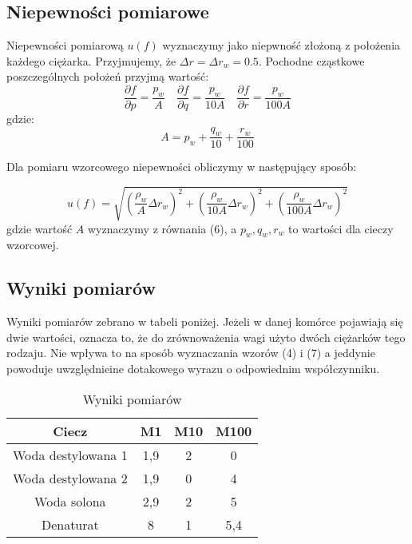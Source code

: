 \documentclass{article} %
\begin{document}
\subsection{Niepewności pomiarowe}

Niepewności pomiarową $u(f)$ wyznaczymy jako niepwność złożoną z położenia każdego ciężarka. Przyjmujemy, że $\Delta r = \Delta r_w = 0.5$. Pochodne cząstkowe poszczególnych położeń przyjmą wartość:
{\
    \begin{equation}
        \frac{\partial f}{\partial p} = \frac{p_w}{A}
        \quad\frac{\partial f}{\partial q} = \frac{p_w}{10A}
        \quad\frac{\partial f}{\partial r} = \frac{p_w}{100A}
    \end{equation}
}
gdzie:
{\
    \begin{equation}
        A = p_w + \frac{q_w}{10} + \frac{r_w}{100}
    \end{equation}
}

Dla pomiaru wzorcowego niepewności obliczymy w następujący sposób:

{\large
    \begin{equation}
        u(f) = \sqrt{(\frac{\rho_w}{A}\Delta r_w)^2+(\frac{\rho_w}{10A}\Delta r_w)^2+(\frac{\rho_w}{100A}\Delta r_w)^2}
    \end{equation}
}
gdzie wartość $A$ wyznaczymy z równania (6), a $p_w, q_w, r_w$ to wartości dla cieczy wzorcowej.
\subsection{Wyniki pomiarów}
Wyniki pomiarów zebrano w tabeli poniżej. Jeżeli w danej komórce pojawiają się dwie wartości, oznacza to, że do zrównoważenia wagi użyto dwóch ciężarków tego rodzaju. Nie wpływa to na sposób wyznaczania wzorów (4) i (7) a jeddynie powoduje uwzględnieine dotakowego wyrazu o odpowiednim współczynniku.

\begin{table}[h!]
\centering
\begin{tabular}{|c|c|c|c|}
\hline
\textbf{Ciecz} & \textbf{M1} & \textbf{M10} & \textbf{M100} \\
\hline
Woda destylowana 1 & 1,9 & 2 & 0 \\
Woda destylowana 2 & 1,9 & 0 & 4 \\
Woda solona & 2,9 & 2 & 5 \\
Denaturat & 8 & 1 & 5,4 \\
\hline
\end{tabular}
\caption{Wyniki pomiarów}
\label{table:students}
\end{table}
\end{document}

